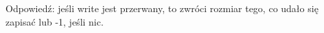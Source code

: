 Odpowiedź: jeśli write jest przerwany, to zwróci rozmiar tego, co udało się zapisać lub -1, jeśli nic.
